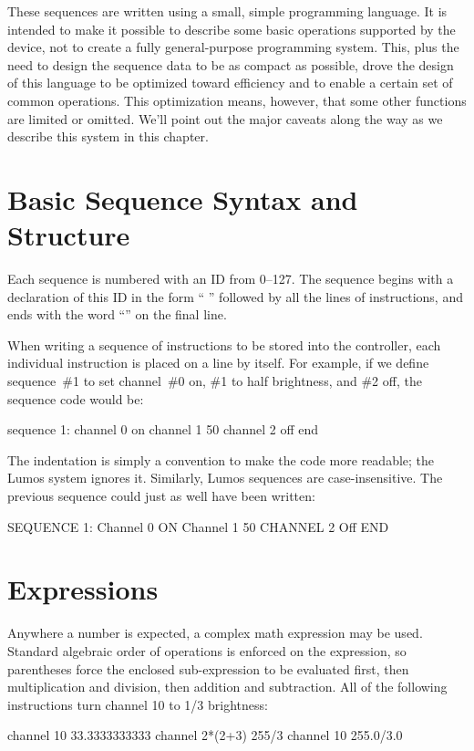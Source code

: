 \documentclass[letterpaper,twoside,onecolumn,openright,final]{memoir}
\begin{document}
{\color{gray}
These sequences are written using a small, simple programming language.  It is intended to
make it possible to describe some basic operations supported by the device, not to create a
fully general-purpose programming system.  This, plus the need to design the sequence data
to be as compact as possible, drove the design of this language to be optimized toward efficiency
and to enable a certain set of common operations.  This optimization means, however, that some
other functions are limited or omitted.  We'll point out the major caveats along the way as we
describe this system in this chapter.

\section{Basic Sequence Syntax and Structure}
Each sequence is numbered with an ID from 0--127.  The sequence begins with a declaration of this
ID in the form `` \z{:}'' followed by all the lines of instructions, and ends
with the word ``'' on the final line.

When writing a sequence of instructions to be stored into the controller, each individual instruction
is placed on a line by itself.  For example, if we define sequence~\#1 to set 
channel~\#0 on, \#1 to half brightness, and \#2 off,
the sequence code would be:
\begin{SourceCode}
sequence 1:
  channel 0 on
  channel 1 50%
  channel 2 off
end
\end{SourceCode}

The indentation is simply a convention to make the code more readable; the Lumos system ignores it.
Similarly, Lumos sequences are case-insensitive.  The previous sequence could just as well have been
written:
\begin{SourceCode}
SEQUENCE 1:
  Channel 0 ON
  Channel 1 50%
  CHANNEL 2 Off
END
\end{SourceCode}

\section{Expressions}
Anywhere a number is expected, a complex math expression may be used.  Standard algebraic order of
operations is enforced on the expression, so parentheses force the enclosed sub-expression to be
evaluated first, then multiplication and division, then addition and subtraction.  All of the following
instructions turn channel 10 to 1/3 brightness:
\begin{SourceCode}
channel 10 33.3333333333%
channel 2*(2+3) 255/3
channel 10 255.0/3.0
\end{SourceCode}

}
\end{document}
